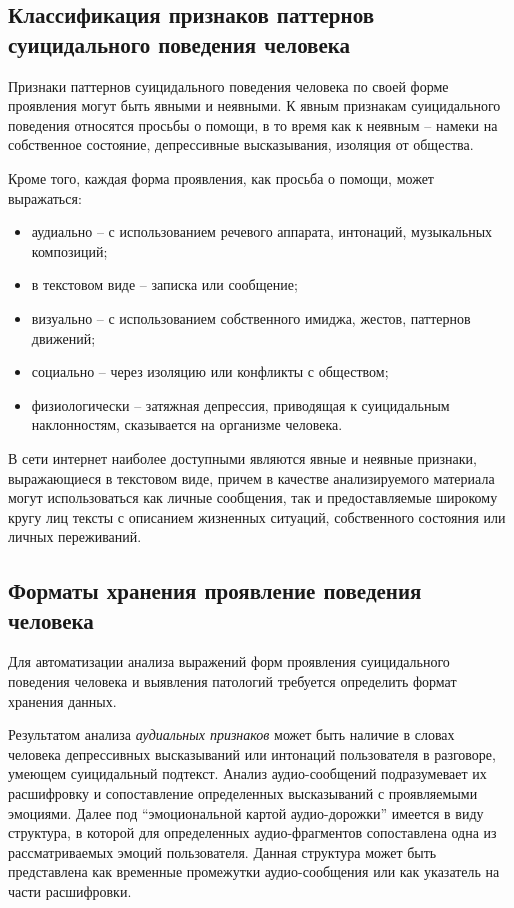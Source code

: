 \subsection{Классификация признаков паттернов суицидального поведения человека}

Признаки паттернов суицидального поведения человека по своей форме проявления могут быть явными и неявными. К явным признакам суицидального поведения относятся просьбы о помощи, в то время как к неявным -- намеки на собственное состояние, депрессивные высказывания, изоляция от общества.

Кроме того, каждая форма проявления, как просьба о помощи, может выражаться:

\begin{itemize}
	\item аудиально -- с использованием речевого аппарата, интонаций, музыкальных композиций;
	\item в текстовом виде -- записка или сообщение;
	\item визуально -- с использованием собственного имиджа, жестов, паттернов движений;
	\item социально -- через изоляцию или конфликты с обществом;
	\item физиологически -- затяжная депрессия, приводящая к суицидальным наклонностям, сказывается на организме человека.
\end{itemize}

В сети интернет наиболее доступными являются явные и неявные признаки, выражающиеся в текстовом виде, причем в качестве анализируемого материала могут использоваться как личные сообщения, так и предоставляемые широкому кругу лиц тексты с описанием жизненных ситуаций, собственного состояния или личных переживаний.

\subsection{Форматы хранения проявление поведения человека}

Для автоматизации анализа выражений форм проявления суицидального поведения человека и выявления патологий требуется определить формат хранения данных.

Результатом анализа \textit{аудиальных признаков} может быть наличие в словах человека депрессивных высказываний или интонаций пользователя в разговоре, умеющем суицидальный подтекст. Анализ аудио-сообщений подразумевает их расшифровку и сопоставление определенных высказываний с проявляемыми эмоциями. Далее под ``эмоциональной картой аудио-дорожки'' имеется в виду структура, в которой для определенных аудио-фрагментов сопоставлена одна из рассматриваемых эмоций пользователя. Данная структура может быть представлена как временные промежутки аудио-сообщения или как указатель на части расшифровки. 

